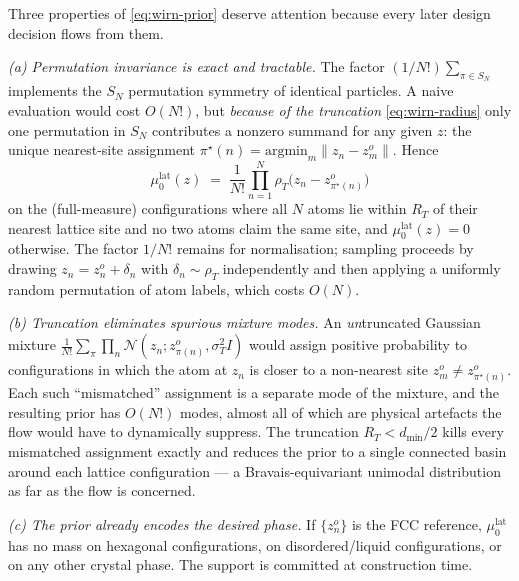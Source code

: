 \documentclass[11pt,letterpaper]{article}
\theoremstyle{plain}
\begin{document}
Three properties of \eqref{eq:wirn-prior} deserve attention because every
later design decision flows from them.

\smallskip\noindent\emph{(a) Permutation invariance is exact and tractable.}
The factor $(1/N!)\sum_{\pi\in S_N}$ implements the $S_N$ permutation
symmetry of identical particles. A naive evaluation would cost $O(N!)$, but
\emph{because of the truncation} \eqref{eq:wirn-radius} only one
permutation in $S_N$ contributes a nonzero summand for any given $z$: the
unique nearest-site assignment
$\pi^\star(n) = \mathrm{argmin}_m\|z_n - z^o_m\|$. Hence
\begin{equation}\label{eq:wirn-eval}
  \mu_0^{\mathrm{lat}}(z) \;=\; \frac{1}{N!}\prod_{n=1}^N \rho_T\!\big(z_n - z^o_{\pi^\star(n)}\big)
\end{equation}
on the (full-measure) configurations where all $N$ atoms lie within $R_T$
of their nearest lattice site and no two atoms claim the same site, and
$\mu_0^{\mathrm{lat}}(z)=0$ otherwise. The factor $1/N!$ remains for
normalisation; sampling proceeds by drawing $z_n=z^o_n+\delta_n$ with
$\delta_n\sim\rho_T$ independently and then applying a uniformly random
permutation of atom labels, which costs $O(N)$.

\smallskip\noindent\emph{(b) Truncation eliminates spurious mixture modes.}
An \emph{un}truncated Gaussian mixture
$\frac{1}{N!}\sum_{\pi}\prod_n \mathcal N(z_n;z^o_{\pi(n)},\sigma_T^2 I)$
would assign positive probability to configurations in which the atom at
$z_n$ is closer to a non-nearest site
$z^o_m\neq z^o_{\pi^\star(n)}$. Each such ``mismatched'' assignment is a
separate mode of the mixture, and the resulting prior has $O(N!)$ modes,
almost all of which are physical artefacts the flow would have to
dynamically suppress. The truncation $R_T<d_{\min}/2$ kills every
mismatched assignment exactly and reduces the prior to a single connected
basin around each lattice configuration --- a Bravais-equivariant unimodal
distribution as far as the flow is concerned.

\smallskip\noindent\emph{(c) The prior already encodes the desired phase.}
If $\{z^o_n\}$ is the FCC reference, $\mu_0^{\mathrm{lat}}$ has no mass on
hexagonal configurations, on disordered/liquid configurations, or on any
other crystal phase. The support is committed at construction time.
\end{document}
